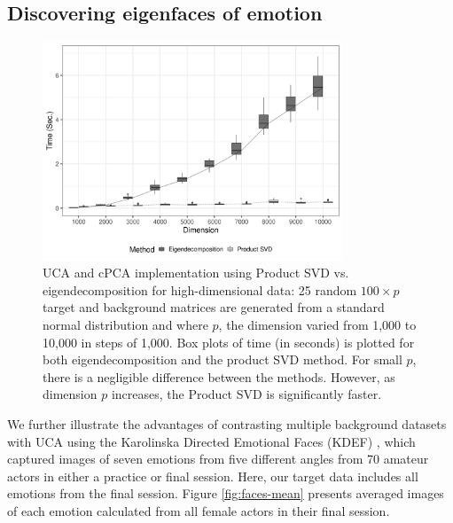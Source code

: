 \documentclass[10pt]{article}
\begin{document}




\subsection{\label{sec:faces}Discovering eigenfaces of emotion}

\begin{figure}[!ht]
  \centering
  \includegraphics[width = 0.8\textwidth]{figure/final_perf_bw.png}
  \caption{UCA and cPCA implementation using Product SVD vs. eigendecomposition for high-dimensional data: 25 random $100 \times p $ target and background matrices are generated from a standard normal distribution and where $p$, the dimension varied from 1,000 to 10,000 in steps of 1,000. Box plots of time (in seconds) is plotted for both eigendecomposition and the product SVD method. For small $p$, there is a negligible difference between the methods. However, as dimension $p$ increases, the Product SVD is significantly faster.}
  \label{fig:computational_perf}
\end{figure}
        We further illustrate the advantages of contrasting multiple background datasets with UCA using the Karolinska Directed Emotional Faces (KDEF) \cite{Calvo2008}, which captured images of seven emotions from five different angles from 70 amateur actors in either a practice or final session. Here, our target data includes all emotions from the final session. Figure \ref{fig:faces-mean} presents averaged images of each emotion calculated from all female actors in their final session. 
\end{document}
